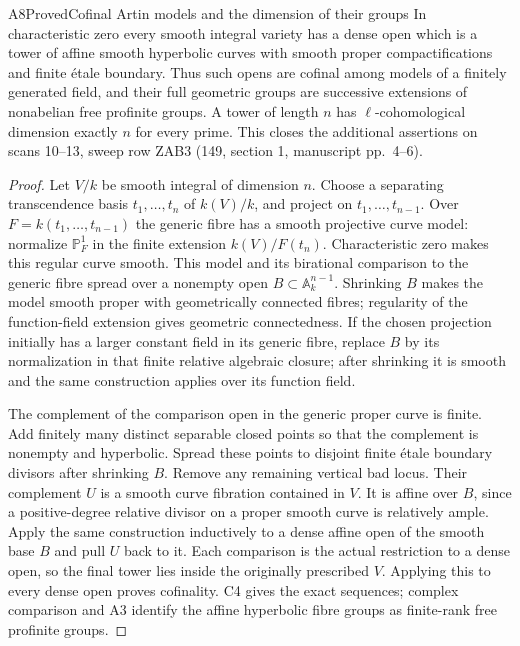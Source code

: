 \begin{result}{A8}{Proved}{Cofinal Artin models and the dimension of their groups}
\label{res:A8}
In characteristic zero every smooth integral variety has a dense
open which is a tower of affine smooth hyperbolic curves with
smooth proper compactifications and finite \'etale boundary.
Thus such opens are cofinal among models of a finitely generated
field, and their full geometric groups are successive extensions
of nonabelian free profinite groups. A tower of length $n$ has
$\ell$-cohomological dimension exactly $n$ for every prime.
This closes the additional assertions on scans 10--13, sweep
row ZAB3 (149, section 1, manuscript pp.~4--6).
\end{result}
\begin{proof}
Let $V/k$ be smooth integral of dimension $n$. Choose a separating
transcendence basis $t_1,\ldots,t_n$ of $k(V)/k$, and project on
$t_1,\ldots,t_{n-1}$. Over $F=k(t_1,\ldots,t_{n-1})$ the generic
fibre has a smooth projective curve model: normalize $\mathbb P^1_F$
in the finite extension $k(V)/F(t_n)$. Characteristic zero makes
this regular curve smooth. This model and its birational comparison
to the generic fibre spread over a nonempty open
$B\subset\mathbb A^{n-1}_k$. Shrinking $B$ makes the model smooth
proper with geometrically connected fibres; regularity of the
function-field extension gives geometric connectedness. If the
chosen projection initially has a larger constant field in its
generic fibre, replace $B$ by its normalization in that finite
relative algebraic closure; after shrinking it is smooth and the
same construction applies over its function field.

The complement of the comparison open in the generic proper curve
is finite. Add finitely many distinct separable closed points so
that the complement is nonempty and hyperbolic. Spread these
points to disjoint finite \'etale boundary divisors after shrinking
$B$. Remove any remaining vertical bad locus. Their complement
$U$ is a smooth curve fibration contained in $V$. It is affine over
$B$, since a positive-degree relative divisor on a proper smooth
curve is relatively ample. Apply the same construction inductively
to a dense affine open of the smooth base $B$ and pull $U$ back to
it. Each comparison is the actual restriction to a dense open,
so the final tower lies inside the originally prescribed $V$.
Applying this to every dense open proves cofinality. C4 gives the
exact sequences; complex comparison and A3 identify the affine
hyperbolic fibre groups as finite-rank free profinite groups.


\end{proof}
